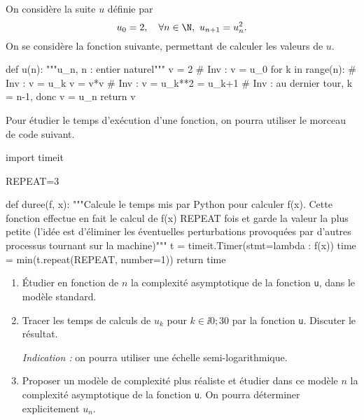 On considère la suite $u$ définie par 
\begin{equation*}
  u_0 = 2,\quad \forall n \in \N,~ u_{n+1} = u_n^2.
\end{equation*}
On se considère la fonction suivante, permettant de calculer les valeurs de $u$. 
\begin{pyverbatim}
def u(n):
    """u_n, n : entier naturel"""
    v = 2
    # Inv : v = u_0
    for k in range(n):
        # Inv : v = u_k
        v = v*v
        # Inv : v = u_k**2 = u_k+1
    # Inv : au dernier tour, k = n-1, donc v = u_n
    return v
\end{pyverbatim}
Pour étudier le temps d'exécution d'une fonction, on pourra utiliser le morceau de code suivant. 
\begin{pyverbatim}
import timeit

REPEAT=3

def duree(f, x):
  """Calcule le temps mis par Python pour calculer f(x).
  Cette fonction effectue en fait le calcul de f(x) REPEAT fois
  et garde la valeur la plus petite
  (l'idée est d'éliminer les éventuelles perturbations provoquées
  par d'autres processus tournant sur la machine)"""
  t = timeit.Timer(stmt=lambda : f(x))
  time = min(t.repeat(REPEAT, number=1))
  return time
\end{pyverbatim}
\begin{enumerate}
  \item Étudier en fonction de $n$ la complexité asymptotique de la fonction \texttt{u}, dans le modèle standard.
  \item Tracer les temps de calculs de $u_k$ pour $k \in \ii{0;30}$ par la fonction \texttt{u}. Discuter le résultat.
  
    \emph{Indication :} on pourra utiliser une échelle semi-logarithmique.
  \item Proposer un modèle de complexité plus réaliste et étudier dans ce modèle $n$ la complexité asymptotique de la fonction \texttt{u}.
    On pourra déterminer explicitement $u_n$. 
\end{enumerate}
